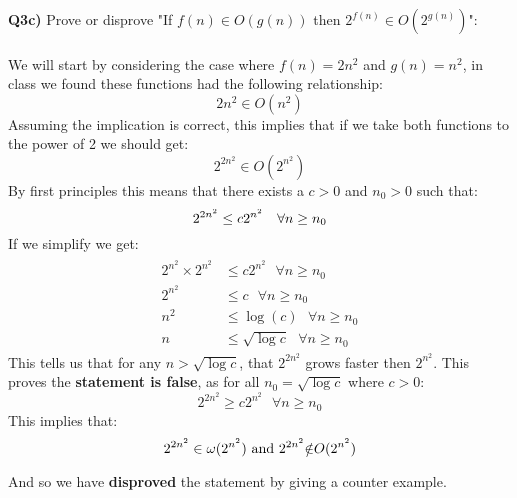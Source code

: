 \documentclass[12pt]{article}
\begin{document}
\newpage
\begin{adjustwidth}{0em}{0pt}
\textbf{Q3c)} Prove or disprove "If $f(n) \in O(g(n))$ then $2^{f(n)} \in O(2^{g(n)})$":\\ \\
We will start by considering the case where $f(n) = 2n^2$ and $g(n) = n^2$, in class we found these functions had the following relationship:
\[ 2n^2 \in O(n^2) \]
Assuming the implication is correct, this implies that if we take both functions to the power of 2 we should get:
\[ 2^{2n^2} \in O(2^{n^2}) \]
By first principles this means that there exists a $c > 0$ and $n_0 > 0$ such that:
\[ 2^{2n^2} \leq c2^{n^2}  \ \ \ \forall n \geq n_0 \\ \]
If we simplify we get:
\begin{align*}
    \begin{aligned}
       2^{n^2}\times2^{n^2} &\leq c2^{n^2}  \ \ \ \forall n \geq n_0 \\
       2^{n^2} &\leq c  \ \ \ \forall n \geq n_0 \\
       n^2 &\leq \log(c)  \ \ \ \forall n \geq n_0 \\
       n &\leq \sqrt{\log c}  \ \ \ \forall n \geq n_0 
    \end{aligned}
\end{align*}
This tells us that for any $n > \sqrt{\log c}$, that $2^{2n^2}$ grows faster then $2^{n^2}$. This proves the \textbf{statement is false}, as for all $n_0 = \sqrt{\log c}$ where $c >0$:
\[  2^{2n^2} \geq c2^{n^2}  \ \ \ \forall n \geq n_0 \]
This implies that:
\[ 2^{2n^2} \in \omega(2^{n^2}) \text{  and   } 2^{2n^2} \xout{\in} O(2^{n^2}) \]
And so we have \textbf{disproved} the statement by giving a counter example.
\end{adjustwidth}
\newpage
\end{document}
